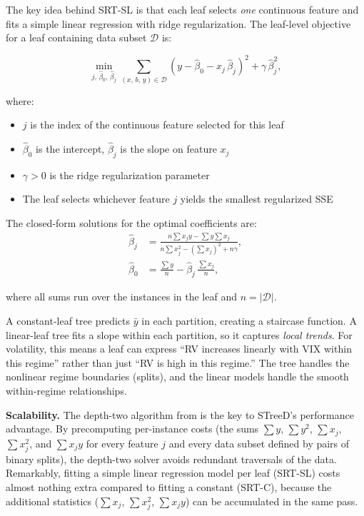 The key idea behind SRT-SL is that each leaf selects \emph{one} continuous
feature and fits a simple linear regression with ridge regularization.  The
leaf-level objective for a leaf containing data subset $\mathcal{D}$ is:

\begin{equation}\label{eq:streed-sl}
  \min_{j,\,\hat{\beta}_0,\,\hat{\beta}_j}
    \sum_{(x,\,b,\,y) \in \mathcal{D}}
    (y - \hat{\beta}_0 - x_j\,\hat{\beta}_j)^2
    + \gamma\,\hat{\beta}_j^2,
\end{equation}

\noindent where:
\begin{itemize}[leftmargin=1.8em]
  \item $j$ is the index of the continuous feature selected for this leaf
  \item $\hat{\beta}_0$ is the intercept,
    $\hat{\beta}_j$ is the slope on feature $x_j$
  \item $\gamma > 0$ is the ridge regularization parameter
  \item The leaf selects whichever feature $j$ yields the smallest
    regularized SSE
\end{itemize}

The closed-form solutions for the optimal coefficients are:
\begin{align}
  \hat{\beta}_j &= \frac{n\sum x_j y - \sum y \sum x_j}
    {n\sum x_j^2 - (\sum x_j)^2 + n\gamma},
    \label{eq:streed-slope}\\
  \hat{\beta}_0 &= \frac{\sum y}{n}
    - \hat{\beta}_j\,\frac{\sum x_j}{n},
    \label{eq:streed-intercept}
\end{align}

\noindent where all sums run over the instances in the leaf and
$n = |\mathcal{D}|$.

\begin{intuition}
A constant-leaf tree predicts $\bar{y}$ in each partition, creating a
staircase function.  A linear-leaf tree fits a slope within each
partition, so it captures \emph{local trends}.  For volatility, this means a
leaf can express ``RV increases linearly with VIX within this regime''
rather than just ``RV is high in this regime.''  The tree handles the
nonlinear regime boundaries (splits), and the linear models handle the
smooth within-regime relationships.
\end{intuition}

\textbf{Scalability.}  The depth-two algorithm from
\citet{VanDenBosEtAl2024} is the key to STreeD's performance advantage.
By precomputing per-instance costs (the sums $\sum y$, $\sum y^2$,
$\sum x_j$, $\sum x_j^2$, and $\sum x_j y$ for every feature $j$ and
every data subset defined by pairs of binary splits), the depth-two
solver avoids redundant traversals of the data.  Remarkably, fitting
a simple linear regression model per leaf (SRT-SL) costs almost nothing
extra compared to fitting a constant (SRT-C), because the additional
statistics ($\sum x_j$, $\sum x_j^2$, $\sum x_j y$) can be accumulated
in the same pass.

